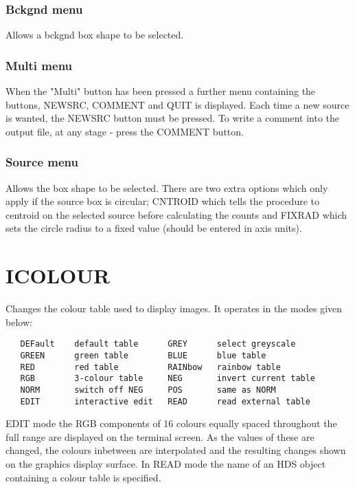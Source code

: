 \documentclass{book}
\renewcommand{\_}{{\tt\char'137}}     %
\begin{document}
\subsubsection{Bckgnd menu}
Allows a bckgnd box shape to be selected.

\subsubsection{Multi menu}
When the "Multi" button has been pressed a further menu containing
the buttons, NEWSRC, COMMENT and QUIT is displayed. Each time a
new source is wanted, the NEWSRC button must be pressed. To write
a comment into the output file, at any stage - press the COMMENT
button.

\subsubsection{Source menu}
Allows the box shape to be selected. There are two extra options
which only apply if the source box is circular; CNTROID which
tells the procedure to centroid on the selected source before
calculating the counts and FIXRAD which sets the circle radius
to a fixed value (should be entered in axis units).

\section{ICOLOUR}
Changes the colour table used to display images. It operates
in the modes given below:

\begin{verbatim}
   DEFault    default table      GREY      select greyscale
   GREEN      green table        BLUE      blue table
   RED        red table          RAINbow   rainbow table
   RGB        3-colour table     NEG       invert current table
   NORM       switch off NEG     POS       same as NORM
   EDIT       interactive edit   READ      read external table
 \end{verbatim}
EDIT mode the RGB components of 16 colours equally spaced
throughout the full range are displayed on the terminal screen.
As the values of these are changed, the colours inbetween are
interpolated and the resulting changes shown on the graphics
display surface. In READ mode the name of an HDS object
containing a colour table is specified.
\end{document}

